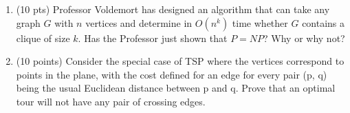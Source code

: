 \documentclass[12pt]{article}
\begin{document}
\begin{enumerate}
    
\item (10 pts) Professor Voldemort has designed an algorithm that can take any graph $G$ with $n$ vertices and determine in $O(n^k)$ time whether $G$ contains a clique of size $k$. Has the Professor just shown that $P = NP$? Why or why not?

\item (10 points) Consider the special case of TSP where the vertices correspond to points in the plane, with the cost defined for an edge for every pair (p, q) being the usual Euclidean distance between p and q. Prove that an optimal tour will not have any pair of crossing edges.
\end{enumerate}
\end{document}
